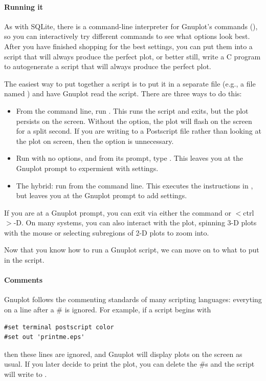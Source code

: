 \paragraph{Running it}
As with SQLite, there is a command-line interpreter for Gnuplot's
commands (), so you can
interactively try different  commands to see what options look
best. After you have finished shopping for the best settings, you can
put them into a script that will always produce the perfect plot, or
better still, write a C program to autogenerate a script that will
always produce the perfect plot.

The easiest way to put together a script is to put it in a separate file
(e.g., a file named ) and have Gnuplot read the script. There
are three ways to do this:
\begin{itemize}
\item From the command line, run . This runs
the script and exits, but the plot persists on the screen. Without the
 option, the plot will flash on the screen for a split
second. If you are writing to a Postscript file rather than looking at
the plot on screen, then the  option is unnecessary.
\item Run  with no options, and from its prompt, type . This leaves you at the Gnuplot prompt to expermient with settings.
\item The hybrid: run  from the command line. This
executes the instructions in , but  leaves you at the Gnuplot
prompt to add settings.
\end{itemize}

If you are at a Gnuplot prompt, you can exit via either the 
command or $<$ctrl$>$-D. On many systems, you can also interact with the plot,
spinning 3-D plots with the mouse or selecting subregions of 2-D plots
to zoom into.


Now that you know how to run a Gnuplot script, we can move on to what
to put in the script.

\paragraph{Comments} 
Gnuplot follows the commenting standards of many scripting languages:
everyting on a line after a \# is ignored. For example, if a script
begins with
\begin{lstlisting}
#set terminal postscript color
#set out 'printme.eps'
\end{lstlisting}
then these lines are ignored, and Gnuplot will display plots on the
screen as usual. If you later decide to print the plot, you can delete
the \#s and the script will write to .


